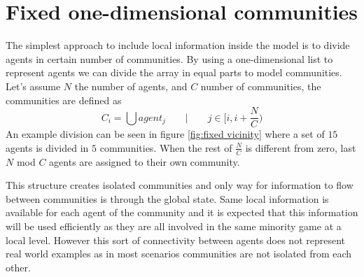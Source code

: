 \section{Fixed one-dimensional communities}
\label{sec:fixed communities}

The simplest approach to include local information inside the model is to divide agents in certain number of communities.
By using a one-dimensional list to represent agents we can divide the array in equal parts to model communities.
Let's assume $N$ the number of agents, and $C$ number of communities, the communities are defined as
\begin{displaymath}
C_i = \bigcup agent_j \qquad|\qquad j\in [i, i+\frac{N}{C})
\end{displaymath}
An example division can be seen in figure \ref{fig:fixed vicinity} where a set of $15$ agents is divided in $5$ communities.
When the rest of $\frac{N}{C}$ is different from zero, last $N$ mod $C$ agents are assigned to their own community.



This structure creates isolated communities and only way for information to flow between communities is through the global state.
Same local information is available for each agent of the community and it is expected that this information will be used efficiently as they are all involved in the same minority game at a local level. 
However this sort of connectivity between agents does not represent real world examples as in most scenarios communities are not isolated from each other.

